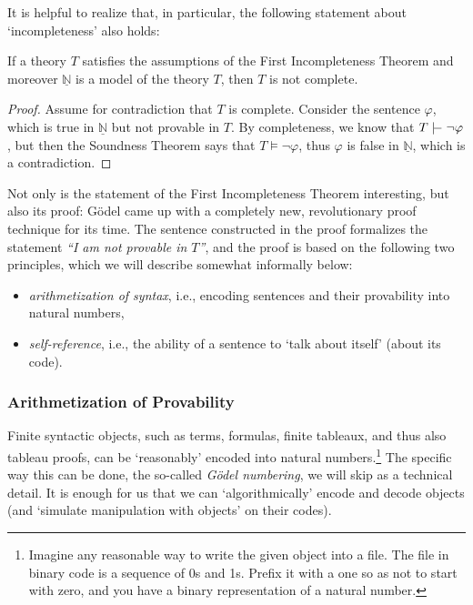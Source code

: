     It is helpful to realize that, in particular, the following statement about `incompleteness' also holds:
    
    \begin{corollary}
        If a theory $T$ satisfies the assumptions of the First Incompleteness Theorem and moreover $\underline{\mathbb N}$ is a model of the theory $T$, then $T$ is not complete.
    \end{corollary}
    \begin{proof}
        Assume for contradiction that $T$ is complete. Consider the sentence $\varphi$, which is true in $\underline{\mathbb N}$ but not provable in $T$. By completeness, we know that $T\proves\neg\varphi$, but then the Soundness Theorem says that $T\models\neg\varphi$, thus $\varphi$ is false in $\underline{\mathbb N}$, which is a contradiction.
    \end{proof}
    
    Not only is the statement of the First Incompleteness Theorem interesting, but also its proof: Gödel came up with a completely new, revolutionary proof technique for its time. The sentence constructed in the proof formalizes the statement \emph{``I am not provable in $T$''}, and the proof is based on the following two principles, which we will describe somewhat informally below:
    \begin{itemize}
        \item \emph{arithmetization of syntax}, i.e., encoding sentences and their provability into natural numbers,
        \item \emph{self-reference}, i.e., the ability of a sentence to `talk about itself' (about its code).
    \end{itemize}
    
    \subsubsection*{Arithmetization of Provability}
    
    Finite syntactic objects, such as terms, formulas, finite tableaux, and thus also tableau proofs, can be `reasonably' encoded into natural numbers.\footnote{Imagine any reasonable way to write the given object into a file. The file in binary code is a sequence of 0s and 1s. Prefix it with a one so as not to start with zero, and you have a binary representation of a natural number.} The specific way this can be done, the so-called \emph{Gödel numbering}, we will skip as a technical detail. It is enough for us that we can `algorithmically' encode and decode objects (and `simulate manipulation with objects' on their codes).
    
